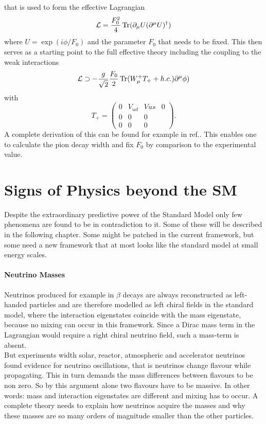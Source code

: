 that is used to form the effective Lagrangian 
\begin{equation}
\mathcal{L}=\frac{F_0^2}{4}\operatorname{Tr}(\partial_\mu U(\partial^\mu U)^\dagger)
\end{equation}
where $U= \exp( i\phi/F_0)$ and the parameter $F_0$ that needs to be fixed. This then serves as a starting point to the full effective theory including the coupling to the weak interactions
\begin{equation}
\mathcal{L}\supset -\frac{g}{\sqrt{2}}\frac{F_0}{2}\operatorname{Tr}(W_\mu^+ T_++h.c.)\partial^\mu \phi)
\end{equation}
with
\begin{equation}
T_+=\begin{pmatrix}
0&V_{ud}&V{us}&0\\0&0&0\\0&0&0
\end{pmatrix}.
\end{equation}
A complete derivation of this can be found for example in ref.\cite{Scherer:2002tk}.
This enables one to calculate the pion decay width and fix $F_0$ by comparison to the experimental value.
\section{Signs of Physics beyond the SM}
Despite the extraordinary predictive power of the Standard Model only few phenomena are found to be in contradiction to it. Some of these will be described in the following chapter. Some might be patched in the current framework, but some need a new framework that at most looks like the standard model at small energy scales. 

\paragraph{Neutrino Masses}
Neutrinos produced for example in $\beta$ decays are always reconstructed as left-handed particles and are therefore modelled as left chiral fields in the standard model, where the interaction eigenstates coincide with the mass eigenstate, because no mixing can occur in this framework.
Since a Dirac mass term in the Lagrangian would require a right chiral neutrino field, such a mass-term is absent. \\
But experiments width solar, reactor, atmospheric and accelerator neutrinos found evidence for neutrino oscillations, that is neutrinos change flavour while propagating. This in turn demands the mass differences between flavours to be non zero. So by this argument alone two flavours have to be massive. In other words: mass and interaction eigenstates are different and mixing has to occur. 
A complete theory needs to explain how neutrinos acquire the masses and why these masses are so many orders of magnitude smaller than the other particles.

